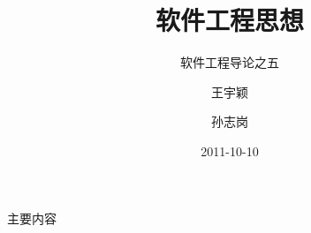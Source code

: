 

\title[Thinking in SE]
{软件工程思想}

\subtitle
{软件工程导论之五} %

\author[\url{http://sunner.cn}] %
{王宇颖 \and 孙志岗}


\date[Short Occasion] %
{2011-10-10}

\subject{Slides}














\begin{frame}
  \titlepage
\end{frame}

\begin{frame}{主要内容}
  \tableofcontents
\end{frame}



